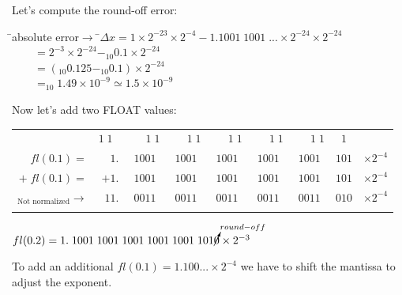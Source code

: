 \documentclass[a4paper,12pt]{report}
\begin{document}
	Let's compute the round-off error:

\begin{tabbing}
	\hspace*{2cm}\=\footnotesize{absolute error$\rightarrow$} \hspace*{0.25cm}\=$\Delta x
		=1\times2^{-23}\times2^{-4}-1.1001\;1001\;...\times2^{-24}\times2^{-24}$\\
	\>\> $\qquad \! \!= 2^{-3}\times2^{-24}-_{10}0.1\times2^{-24}$\\
	\>\> $\qquad \! \!= (_{10}0.125-_{10}0.1)\times2^{-24}$\\
	\>\> $\qquad \! \!=_{10}\!1.49\times10^{-9}\simeq1.5\times10^{-9}$\\

\end{tabbing}

	Now let's add two FLOAT values:

\begin{center}
	\begin{tabular}{rrccccccr}
		& \tiny{$1\;1\;\;$} &  \tiny{$\quad\, \;1\;1$} & \tiny{$\quad\, \;1\;1$} 
			& \tiny{$\quad\, \;1\;1$} & \tiny{$\quad\, \;1\;1$} & \tiny{$\quad\, \;1\;1$} 
			& \tiny{$1$} & \\
		$fl(0.1)=$ & $1.$ & $\!1001$ & $1001$ & $1001$ & $1001$ & $1001$ & $101$ 
			& $\times2^{-4}$\\
		$+\;fl(0.1)=$ & $+1.$ & $\!1001$ & $1001$ & $1001$ & $1001$ & $1001$ & $101$ 
			& $\times2^{-4}$\\
		\hline
		$_{\text{Not normalized}}\rightarrow$& $11.$ & $\!0011$ & $0011$ & $0011$ & $0011$ 
			& $0011$ & $010$ & $\times2^{-4}$\\ \\
	\end{tabular}

	$fl(0.2) = 1.\;1001\;1001\;1001\;1001\;1001\;101\cancelto{round-off}{0} \times2^{-3}$
\end{center}

	To add an additional $fl(0.1)=1.100...\times2^{-4}$ we have to shift the mantissa to adjust the 
	exponent.
\end{document}
